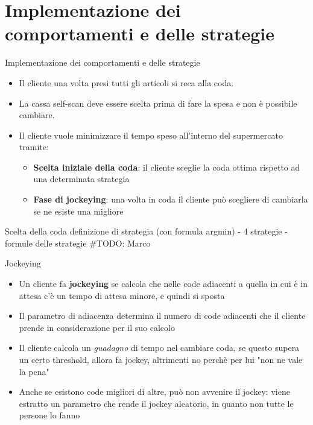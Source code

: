 \section{Implementazione dei comportamenti e delle strategie}





\begin{frame}{Implementazione dei comportamenti e delle strategie}
	\begin{itemize}
		\item Il cliente una volta presi tutti gli articoli si reca alla coda.
		\item La cassa self-scan deve essere scelta prima di fare la spesa e non è possibile cambiare.
		\item Il cliente vuole minimizzare il tempo speso all'interno del supermercato tramite:
		\begin{itemize}
			\item \textbf{Scelta iniziale della coda}: il cliente sceglie la coda ottima rispetto ad una determinata strategia
			\item \textbf{Fase di jockeying}: una volta in coda il cliente può scegliere di cambiarla se ne esiste una migliore
		\end{itemize}
	\end{itemize}
\end{frame}





\begin{frame}{Scelta della coda}
	\centering
	definizione di strategia (con formula argmin) - 4 strategie - formule delle strategie
	\#TODO: Marco

\end{frame}





\begin{frame}{Jockeying}
	\begin{itemize}
		\item Un cliente fa \textbf{jockeying} se calcola che nelle code adiacenti a quella in cui è in attesa c'è un tempo di attesa minore, e quindi si sposta
		\item Il parametro di adiacenza determina il numero di code adiacenti che il cliente prende in considerazione per il suo calcolo
		\item Il cliente calcola un \textit{guadagno} di tempo nel cambiare coda, se questo supera un certo threshold, allora fa jockey, altrimenti no perchè per lui "non ne vale la pena"
		\item Anche se esistono code migliori di altre, può non avvenire il jockey: viene estratto un parametro che rende il jockey aleatorio, in quanto non tutte le persone lo fanno
	\end{itemize}
\end{frame}

